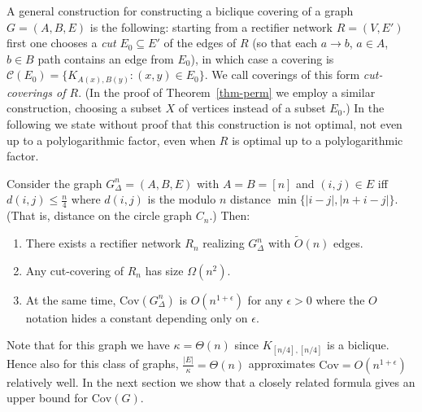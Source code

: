 \documentclass[submission]{llncs}
\def\Cov{{\mathrm{Cov}}}
\begin{document}
  A general construction for constructing
  a biclique covering of a graph $G=(A,B,E)$ is the following: starting from a rectifier network $R=(V,E')$
  first one chooses a \emph{cut} $E_0\subseteq E'$ of the edges of $R$ (so that each $a\to b$, $a\in A$, $b\in B$ path contains an edge
  from $E_0$), in which case a covering is $\mathcal{C}(E_0)=\{K_{A(x),B(y)}:(x,y)\in E_0\}$.
  We call coverings of this form \emph{cut-coverings of $R$}.
  (In the proof of Theorem~\ref{thm-perm} we employ a similar construction, choosing a subset $X$ of vertices instead of a subset $E_0$.)
  In the following we state without proof that this
  construction is not optimal, not even up to a polylogarithmic factor, even when $R$ is optimal up to a polylogarithmic factor.
  \begin{theorem}
  \label{thm-negyed}
  Consider the graph $G_\Delta^n=(A,B,E)$ with $A=B=[n]$ and $(i,j)\in E$ iff $d(i,j)\leq\frac{n}{4}$ where $d(i,j)$
  is the modulo $n$ distance $\min\{|i-j|,|n+i-j|\}$. (That is, distance on the circle graph $C_n$.) Then:
  \begin{enumerate}
  \item There exists a rectifier network $R_n$ realizing $G_\Delta^n$ with $\tilde{O}(n)$ edges.
  \item Any cut-covering of $R_n$ has size $\Omega(n^2)$.
  \item At the same time, $\Cov(G_\Delta^n)$ is $O(n^{1+\epsilon})$ for any $\epsilon>0$ where the $O$ notation hides a constant depending only on $\epsilon$.
  \end{enumerate}
  \end{theorem}
Note that for this graph we have $\kappa=\Theta(n)$ since $K_{[n/4],[n/4]}$ is a biclique.
  Hence also for this class of graphs, $\frac{|E|}{\kappa}=\Theta(n)$ approximates $\Cov=O(n^{1+\epsilon})$ relatively well.
In the next section we show that a closely related formula gives an upper bound for $\Cov(G)$.
\end{document}
